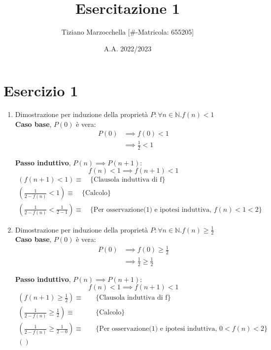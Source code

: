 \documentclass{article}
\title{Esercitazione 1}
\author{Tiziano Marzocchella [\#-Matricola: 655205]}
\date{A.A. 2022/2023}
\begin{document}
\section{Esercizio 1}
\begin{enumerate}
    \item Dimostrazione per induzione della proprietà \(P: \forall n \in \mathbb{N} . f(n) < 1\) \\
          \textbf{Caso base}, \(P(0)\) è vera:
          \begin{align*}
              P(0) & \implies f(0) < 1        \\
                   & \implies \frac{1}{2} < 1
          \end{align*}

          \textbf{Passo induttivo}, \(P(n) \implies P(n + 1)\):
          \[f(n) < 1 \implies f(n + 1) < 1\]
          \begin{align*}
              (f(n + 1) < 1) \equiv \quad \text{\{Clausola induttiva di f\}} \\
              (\frac{1}{2 - f(n)} < 1) \equiv \quad \text{\{Calcolo\}}  \\
              (\frac{1}{2 - f(n)} < \frac{1}{2 - 1}) \equiv \quad \text{\{Per osservazione(1) e ipotesi induttiva, \(f(n) < 1 < 2\)\}}
          \end{align*}

    \item Dimostrazione per induzione della proprietà \(P: \forall n \in \mathbb{N} . f(n) \geq \frac{1}{2}\) \\
          \textbf{Caso base}, \(P(0)\) è vera:
          \begin{align*}
              P(0) & \implies f(0) \geq \frac{1}{2} \\
                   & \implies \frac{1}{2} \geq \frac{1}{2}
          \end{align*}

          \textbf{Passo induttivo}, \(P(n) \implies P(n + 1)\):
          \[f(n) < 1 \implies f(n + 1) < 1\]
          \begin{align*}
              \left(f(n + 1) \geq \frac{1}{2}\right)               \equiv & \quad \text{\{Clausola induttiva di f\}} \\
              \left(\frac{1}{2 - f(n)} \geq \frac{1}{2}\right)     \equiv & \quad \text{\{Calcolo\}} \\
              \left(\frac{1}{2 - f(n)} \geq \frac{1}{2 - 0}\right) \equiv & \quad \text{\{Per osservazione(1) e ipotesi induttiva, \(0 < f(n) < 2\)\}} \\
              \left(\right)
          \end{align*}
\end{enumerate}
\end{document}
